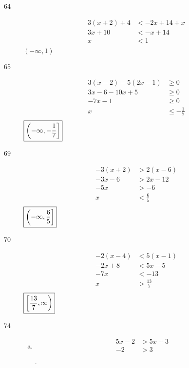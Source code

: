 \documentclass[letterpaper]{exam}
\begin{document}
\begin{description}
      \item[64]
        \begin{align*}
          3(x + 2) + 4 & < -2x + 14 + x \\
          3x + 10      & < -x + 14 \\
          x            & < 1 \\
        \end{align*}
        $\boxed{ (-\infty, 1) }$

      \item[65]
        \begin{align*}
          3(x - 2) - 5(2x - 1) & \geq 0 \\
          3x - 6 - 10x + 5     & \geq 0 \\
          -7x - 1              & \geq 0 \\
          x                    & \leq - \frac{1}{7} \\
        \end{align*}
        $\boxed{ \intoc{ -\infty, - \frac{1}{7} } }$

      \item[69]
        \begin{align*}
          -3(x + 2) & > 2(x - 6) \\
          -3x - 6   & > 2x - 12 \\
          -5x       & > -6 \\
          x         & < \frac{6}{5} \\
        \end{align*}
        $\boxed{ \intoc{ -\infty, \frac{6}{5} } }$

      \item[70]
        \begin{align*}
          -2(x - 4) & < 5(x - 1) \\
          -2x + 8   & < 5x - 5 \\
          -7x       & < -13 \\
          x         & > \frac{13}{7} \\
        \end{align*}
        $\boxed{ \intco{ \frac{13}{7}, \infty } }$

      \item[74]
        \begin{enumerate}[(a)]
          \item
            \begin{align*}
              5x - 2 & > 5x + 3 \\
              -2     & > 3 \\
            \end{align*}
            .


\end{enumerate}
\end{description}
\end{document}
